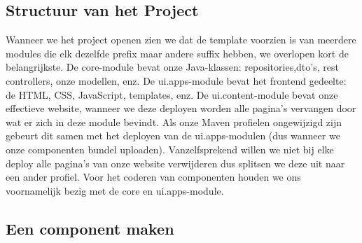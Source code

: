 	\subsection{Structuur van het Project}
	Wanneer we het project openen zien we dat de template voorzien is van meerdere modules die elk dezelfde prefix maar andere suffix hebben, we overlopen kort de belangrijkste. De core-module bevat onze Java-klassen: repositories,dto's, rest controllers, onze modellen, enz. De ui.apps-module bevat het frontend gedeelte: de HTML, CSS, JavaScript, templates, enz. De ui.content-module bevat onze effectieve website, wanneer we deze deployen worden alle pagina's vervangen door wat er zich in deze module bevindt. Als onze Maven profielen ongewijzigd zijn gebeurt dit samen met het deployen van de ui.apps-modulen (dus wanneer we onze componenten bundel uploaden). Vanzelfsprekend willen we niet bij elke deploy alle pagina's van onze website verwijderen dus splitsen we deze uit naar een ander profiel. Voor het coderen van componenten houden we ons voornamelijk bezig met de core en ui.apps-module.
	\subsection{Een component maken}
	
